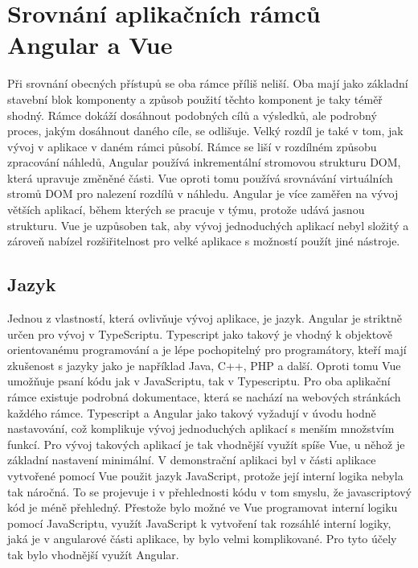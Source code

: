 \chapter{Srovnání aplikačních rámců Angular a Vue}
Při srovnání obecných přístupů se oba rámce příliš neliší. Oba mají jako základní stavební blok komponenty a způsob použití těchto komponent je taky téměř shodný. Rámce dokáží dosáhnout podobných cílů a výsledků, ale podrobný proces, jakým dosáhnout daného cíle, se odlišuje. Velký rozdíl je také v tom, jak vývoj v aplikace v daném rámci působí.
Rámce se liší v rozdílném způsobu zpracování náhledů, Angular používá inkrementální stromovou strukturu DOM, která upravuje změněné části. Vue oproti tomu používá srovnávání virtuálních stromů DOM pro nalezení rozdílů v náhledu. Angular je více zaměřen na vývoj větších aplikací, během kterých se pracuje v týmu, protože udává jasnou strukturu. Vue je uzpůsoben tak, aby vývoj jednoduchých aplikací nebyl složitý a zároveň nabízel rozšiřitelnost pro velké aplikace s možností použít jiné nástroje.

    \section{Jazyk}
Jednou z vlastností, která ovlivňuje vývoj aplikace, je jazyk. Angular je striktně určen pro vývoj v TypeScriptu. Typescript jako takový je vhodný k objektově orientovanému programování a je lépe pochopitelný pro programátory, kteří mají zkušenost s jazyky jako je například Java, C++, PHP a další. Oproti tomu Vue umožňuje psaní kódu jak v JavaScriptu, tak v Typescriptu. Pro oba aplikační rámce existuje podrobná dokumentace, která se nachází na webových stránkách každého rámce. Typescript a Angular jako takový vyžadují v úvodu hodně nastavování, což komplikuje vývoj jednoduchých aplikací s menším množstvím funkcí. Pro vývoj takových aplikací je tak vhodnější využít spíše Vue, u něhož je základní nastavení minimální.
V demonstrační aplikaci byl v části aplikace vytvořené pomocí Vue použit jazyk JavaScript, protože její interní logika nebyla tak náročná. To se projevuje i v přehlednosti kódu v tom smyslu, že javascriptový kód je méně přehledný. Přestože bylo možné ve Vue programovat interní logiku pomocí JavaScriptu, využít JavaScript k vytvoření tak rozsáhlé interní logiky, jaká je v angularové části aplikace, by bylo velmi komplikované. Pro tyto účely tak bylo vhodnější využít Angular.

